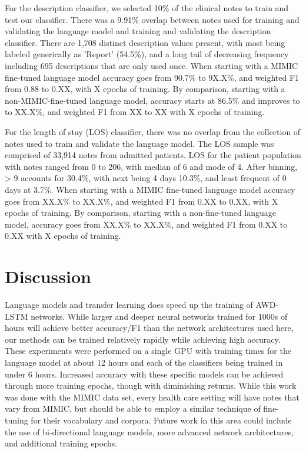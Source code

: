 \documentclass{amia}
\begin{document}
For the description classifier, we selected 10\% of the clinical notes to train and test our classifier. There was a 9.91\% overlap between notes used for training and validating the language model and training and validating the description classifier. There are 1,708 distinct description values present, with most being labeled generically as 'Report' (54.5\%), and a long tail of decreasing frequency including 695 descriptions that are only used once. When starting with a MIMIC fine-tuned language model accuracy goes from 90.7\% to 9X.X\%, and weighted F1 from 0.88 to 0.XX, with X epochs of training. By comparison, starting with a non-MIMIC-fine-tuned language model, accuracy starts at 86.5\% and improves to to XX.X\%, and weighted F1 from XX to XX with X epochs of training.

For the length of stay (LOS) classifier, there was no overlap from the collection of notes used to train and validate the language model. The LOS sample was comprised of 33,914 notes from admitted patients. LOS for the patient population with notes ranged from 0 to 206, with median of 6 and mode of 4. After binning, > 9 accounts for 30.4\%, with next being 4 days 10.3\%, and least frequent of 0 days at 3.7\%. When starting with a MIMIC fine-tuned language model accuracy goes from XX.X\% to XX.X\%, and weighted F1 from 0.XX to 0.XX, with X epochs of training. By comparison, starting with a non-fine-tuned language model, accuracy goes from XX.X\% to XX.X\%, and weighted F1 from 0.XX to 0.XX with X epochs of training.

\section*{Discussion}

Language models and transfer learning does speed up the training of AWD-LSTM networks. While larger and deeper neural networks trained for 1000s of hours will achieve better accuracy/F1 than the network architectures used here, our methods can be trained relatively rapidly while achieving high accuracy. These experiments were performed on a single GPU with training times for the language model at about 12 hours and each of the classifiers being trained in under 6 hours. Increased accuracy with these specific models can be achieved through more training epochs, though with diminishing returns. While this work was done with the MIMIC data set, every health care setting will have notes that vary from MIMIC, but should be able to employ a similar technique of fine-tuning for their vocabulary and corpora. Future work in this area could include the use of bi-directional language models, more advanced network architectures, and additional training epochs.
\end{document}
